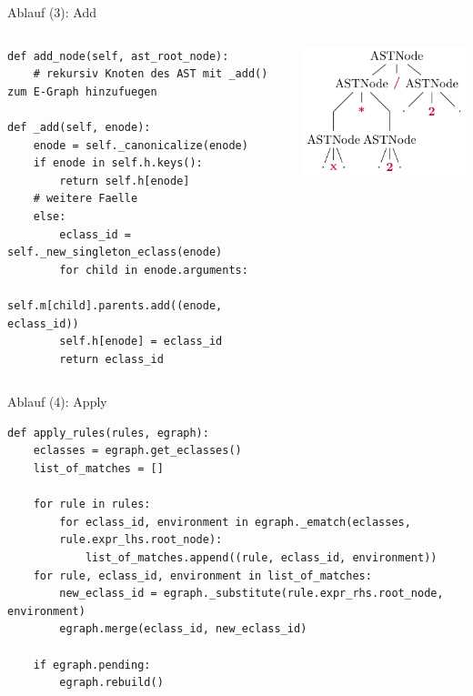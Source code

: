 \begin{frame}[fragile]{Ablauf (3): Add}
    \begin{columns}[c]
\begin{verbatim}    
def add_node(self, ast_root_node): 
    # rekursiv Knoten des AST mit _add() zum E-Graph hinzufuegen 

def _add(self, enode): 
    enode = self._canonicalize(enode)
    if enode in self.h.keys(): 
        return self.h[enode]
    # weitere Faelle 
    else:
        eclass_id = self._new_singleton_eclass(enode)
        for child in enode.arguments:
            self.m[child].parents.add((enode, eclass_id)) 
        self.h[enode] = eclass_id
        return eclass_id
\end{verbatim}
            \includegraphics[scale=1]{utils/ast.pdf}
    \end{columns}
\end{frame}

\begin{frame}[fragile]{Ablauf (4): Apply}
\begin{verbatim}    
def apply_rules(rules, egraph):
    eclasses = egraph.get_eclasses()
    list_of_matches = []

    for rule in rules:
        for eclass_id, environment in egraph._ematch(eclasses, 
        rule.expr_lhs.root_node):
            list_of_matches.append((rule, eclass_id, environment))
    for rule, eclass_id, environment in list_of_matches:
        new_eclass_id = egraph._substitute(rule.expr_rhs.root_node, environment)
        egraph.merge(eclass_id, new_eclass_id)
        
    if egraph.pending:
        egraph.rebuild()
\end{verbatim}
\end{frame}

